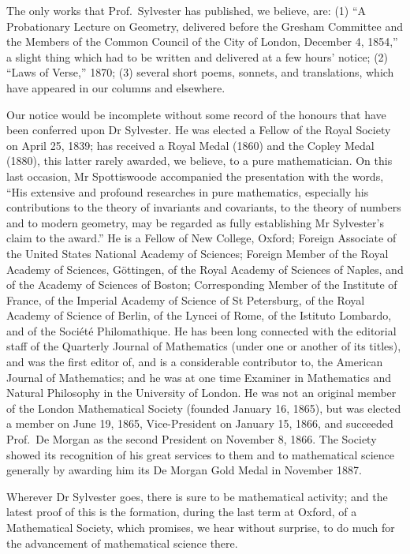\documentclass[11pt,a4paper]{article}
\begin{document}
The only works that Prof.\ Sylvester has published, we believe, are: (1) ``A Probationary Lecture on Geometry, delivered before the Gresham Committee and the Members of the Common Council of the City of London, December 4, 1854,'' a slight thing which had to be written and delivered at a few hours' notice; (2) ``Laws of Verse,'' 1870; (3) several short poems, sonnets, and translations, which have appeared in our columns and elsewhere.

Our notice would be incomplete without some record of the honours that have been conferred upon Dr Sylvester. He was elected a Fellow of the Royal Society on April 25, 1839; has received a Royal Medal (1860) and the Copley Medal (1880), this latter rarely awarded, we believe, to a pure mathematician. On this last occasion, Mr Spottiswoode accompanied the presentation with the words, ``His extensive and profound researches in pure mathematics, especially his contributions to the theory of invariants and covariants, to the theory of numbers and to modern geometry, may be regarded as fully establishing Mr Sylvester's claim to the award.'' He is a Fellow of New College, Oxford; Foreign Associate of the United States National Academy of Sciences; Foreign Member of the Royal Academy of Sciences, G\"ottingen, of the Royal Academy of Sciences of Naples, and of the Academy of Sciences of Boston; Corresponding Member of the Institute of France, of the Imperial Academy of Science of St Petersburg, of the Royal Academy of Science of Berlin, of the Lyncei of Rome, of the Istituto Lombardo, and of the Soci\'et\'e Philomathique. He has been long connected with the editorial staff of the Quarterly Journal of Mathematics (under one or another of its titles), and was the first editor of, and is a considerable contributor to, the American Journal of Mathematics; and he was at one time Examiner in Mathematics and Natural Philosophy in the University of London. He was not an original member of the London Mathematical Society (founded January 16, 1865), but was elected a member on June 19, 1865, Vice-President on January 15, 1866, and succeeded Prof.\ De Morgan as the second President on November 8, 1866. The Society showed its recognition of his great services to them and to mathematical science generally by awarding him its De Morgan Gold Medal in November 1887.

Wherever Dr Sylvester goes, there is sure to be mathematical activity; and the latest proof of this is the formation, during the last term at Oxford, of a Mathematical Society, which promises, we hear without surprise, to do much for the advancement of mathematical science there.
\end{document}
